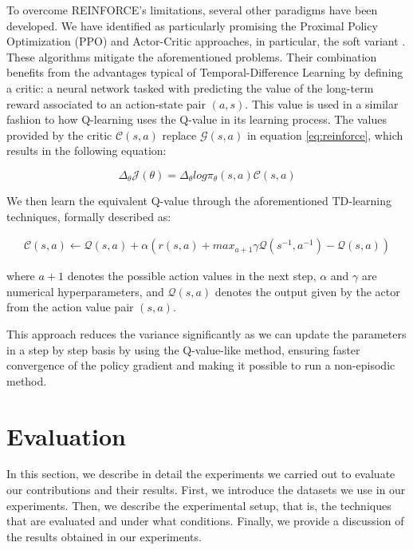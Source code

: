 To overcome REINFORCE's limitations, several other paradigms have been developed. We have identified as particularly promising the Proximal Policy Optimization (PPO) \cite{schulman2017proximal} and Actor-Critic \cite{castro2010convergent} approaches, in particular, the soft variant \cite{haarnoja2018soft}. These algorithms mitigate the aforementioned problems.
Their combination benefits from the advantages typical of Temporal-Difference Learning \cite{sutton1988learning} by defining a critic: a neural network tasked with predicting the value of the long-term reward associated to an action-state pair $(a,s)$. This value is used in a similar fashion to how Q-learning \cite{watkins1992q} uses the Q-value in its learning process. The values provided by the critic $\mathcal{C}(s,a)$ replace $\mathcal{G}(s,a)$ in equation \ref{eq:reinforce}, which results in the following equation:

\begin{equation}
\label{eq:ActorCritic}
    \Delta_{\theta}\mathcal{J}(\theta) =\Delta_{\theta}log\pi_{\theta}(s,a)\mathcal{C}(s,a) 
\end{equation}

We then learn the equivalent Q-value through the aforementioned TD-learning techniques, formally described as:

\begin{equation}
\label{eq:TemporalDifference}
\begin{split}
    \mathcal{C}(s,a) \gets \mathcal{Q}(s,a) + \alpha(r(s,a) + max_{a+1} \gamma \mathcal{Q}(s^{-1},a^{-1}) - \mathcal{Q}(s,a))
\end{split}
\end{equation}

where $a+1$ denotes the possible action values in the next step, $\alpha$ and $\gamma$ are numerical hyperparameters, and $\mathcal{Q}(s,a)$ denotes the output given by the actor from the action value pair $(s,a)$.

This approach reduces the variance significantly as we can update the parameters in a step by step basis by using the Q-value-like method, ensuring faster convergence of the policy gradient and making it possible to run a non-episodic method.

\section{Evaluation}\label{sec:spacerl-evaluation}
In this section, we describe in detail the experiments we carried out to evaluate our contributions and their results. First, we introduce the datasets we use in our experiments. Then, we describe the experimental setup, that is, the techniques that are evaluated and under what conditions. Finally, we provide a discussion of the results obtained in our experiments.


